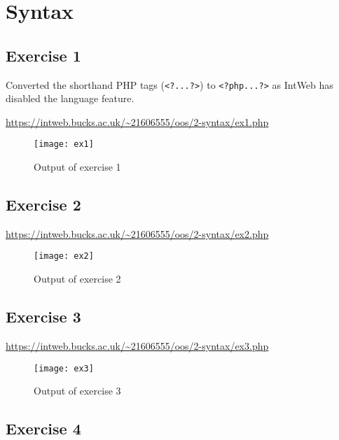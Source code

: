 \chapter{Syntax}
\graphicspath{{2-syntax/images/}}

\section{Exercise 1}

Converted the shorthand PHP tags (\texttt{<?...?>}) to \texttt{<?php...?>} as IntWeb has disabled the language feature.

\url{https://intweb.bucks.ac.uk/~21606555/oos/2-syntax/ex1.php}
\captionsetup{type=figure}


\begin{figure}[H]
  \caption{Output of exercise 1}
  \centering
  \texttt{[image: ex1]}
\end{figure}

\section{Exercise 2}

\url{https://intweb.bucks.ac.uk/~21606555/oos/2-syntax/ex2.php}
\captionsetup{type=figure}


\begin{figure}[H]
  \caption{Output of exercise 2}
  \centering
  \texttt{[image: ex2]}
\end{figure}

\section{Exercise 3}

\url{https://intweb.bucks.ac.uk/~21606555/oos/2-syntax/ex3.php}
\captionsetup{type=figure}


\begin{figure}[H]
  \caption{Output of exercise 3}
  \centering
  \texttt{[image: ex3]}
\end{figure}

\section{Exercise 4}

